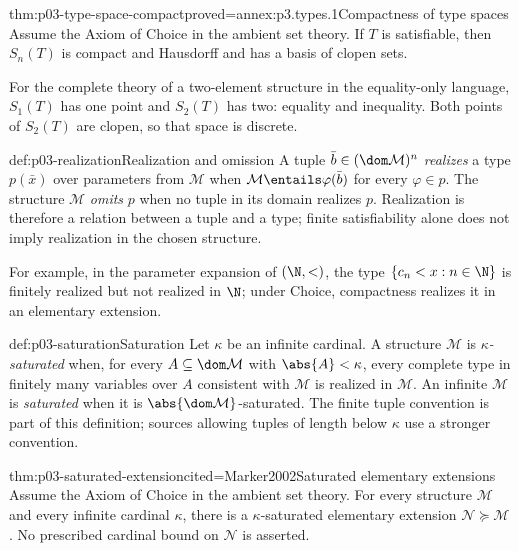 \begin{hbtheorem}{thm:p03-type-space-compact}{proved=annex:p3.types.1}{Compactness of type spaces}
Assume the Axiom of Choice in the ambient set theory.  If \(T\) is
satisfiable, then \(S_n(T)\) is compact and Hausdorff and has a basis of
clopen sets.
\end{hbtheorem}

For the complete theory of a two-element structure in the equality-only
language, \(S_1(T)\) has one point and \(S_2(T)\) has two: equality and
inequality.  Both points of \(S_2(T)\) are clopen, so that space is discrete.

\begin{hbdefinition}{def:p03-realization}{Realization and omission}
A tuple \(\bar b\in(\dom\mathcal M)^n\) \emph{realizes} a type
\(p(\bar x)\) over parameters from \(\mathcal M\) when
\(\mathcal M\entails\varphi(\bar b)\) for every \(\varphi\in p\).
The structure \(\mathcal M\) \emph{omits} \(p\) when no tuple in its domain
realizes \(p\).  Realization is therefore a relation between a tuple and a
type; finite satisfiability alone does not imply realization in the chosen
structure.
\end{hbdefinition}

For example, in the parameter expansion of \((\N,<)\), the type
\(\{c_n<x:n\in\N\}\) is finitely realized but not realized in \(\N\); under
Choice, compactness realizes it in an elementary extension.

\begin{hbdefinition}{def:p03-saturation}{Saturation}
Let \(\kappa\) be an infinite cardinal.  A structure \(\mathcal M\) is
\emph{\(\kappa\)-saturated} when, for every
\(A\subseteq\dom\mathcal M\) with \(\abs{A}<\kappa\), every complete type
in finitely many variables over \(A\) consistent with \(\mathcal M\) is
realized in \(\mathcal M\).  An infinite \(\mathcal M\) is
\emph{saturated} when it is \(\abs{\dom\mathcal M}\)-saturated.  The finite
tuple convention is part of this definition; sources allowing tuples of
length below \(\kappa\) use a stronger convention.
\end{hbdefinition}

\begin{hbtheorem}{thm:p03-saturated-extension}{cited=Marker2002}{Saturated elementary extensions}
Assume the Axiom of Choice in the ambient set theory.  For every structure
\(\mathcal M\) and every infinite cardinal \(\kappa\), there is a
\(\kappa\)-saturated elementary extension
\(\mathcal N\succcurlyeq\mathcal M\).  No prescribed cardinal bound on
\(\mathcal N\) is asserted.
\end{hbtheorem}

